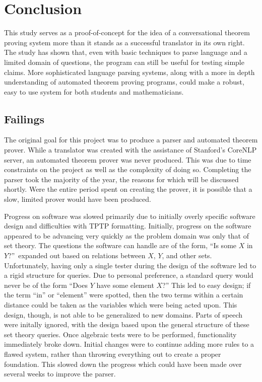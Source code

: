 \chapter{Conclusion}

This study serves as a proof-of-concept for the idea of a conversational theorem proving system more than it stands as a successful translator in its own right. The study has shown that, even with basic techniques to parse language and a limited domain of questions, the program can still be useful for testing simple claims. More sophisticated language parsing systems, along with a more in depth understanding of automated theorem proving programs, could make a robust, easy to use system for both students and mathematicians.

\section{Failings}

The original goal for this project was to produce a parser and automated theorem prover. While a translator was created with the assistance of Stanford's CoreNLP server, an automated theorem prover was never produced. This was due to time constraints on the project as well as the complexity of doing so. Completing the parser took the majority of the year, the reasons for which will be discussed shortly. Were the entire period spent on creating the prover, it is possible that a slow, limited prover would have been produced.

Progress on software was slowed primarily due to initially overly specific software design and difficulties with TPTP formatting. Initially, progress on the software appeared to be advancing very quickly as the problem domain was only that of set theory. The questions the software can handle are of the form, ``Is some $X$ in $Y$?''\ expanded out based on relations between $X$, $Y$, and other sets. Unfortunately, having only a single tester during the design of the software led to a rigid structure for queries. Due to personal preference, a standard query would never be of the form ``Does $Y$ have some element $X$?'' This led to easy design; if the term ``in'' or ``element'' were spotted, then the two terms within a certain distance could be taken as the variables which were being acted upon. This design, though, is not able to be generalized to new domains. Parts of speech were initally ignored, with the design based upon the general structure of these set theory queries. Once algebraic tests were to be performed, functionality immediately broke down. Initial changes were to continue adding more rules to a flawed system, rather than throwing everything out to create a proper foundation. This slowed down the progress which could have been made over several weeks to improve the parser.

